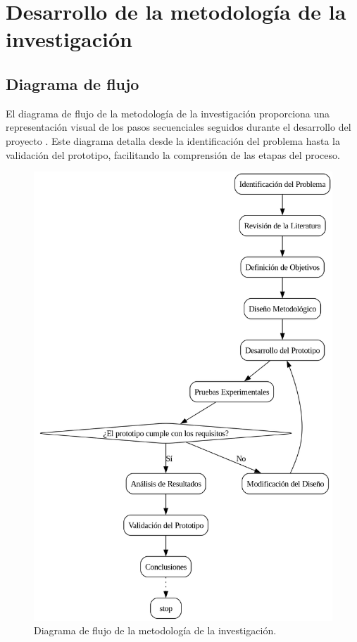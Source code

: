 \chapter{Desarrollo de la metodología de la investigación}
\section{Diagrama de flujo}
El diagrama de flujo de la metodología de la investigación proporciona una representación visual de los pasos secuenciales seguidos durante el desarrollo del proyecto \cite{Clark2026}. Este diagrama detalla desde la identificación del problema hasta la validación del prototipo, facilitando la comprensión de las etapas del proceso.
\begin{figure}[H]
    \centering
    \includegraphics[width=1\textwidth]{img/Metodologia.png}
    \caption{Diagrama de flujo de la metodología de la investigación.}
    \label{fig:flowchart1}
\end{figure}


